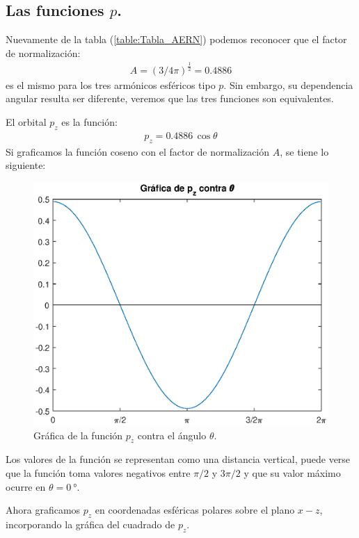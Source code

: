 \subsection*{Las funciones \texorpdfstring{$p$}{p}.}

Nuevamente de la tabla (\ref{table:Tabla_AERN}) podemos reconocer que el factor de normalización:
\begin{align*}
A = (3/4 \pi)^{\frac{1}{2}} = 0.4886
\end{align*}
es el mismo para los tres armónicos esféricos tipo $p$. Sin embargo, su dependencia angular resulta ser diferente, veremos que las tres funciones son equivalentes.
\par
El orbital $p_{z}$ es la función:
\begin{align*}
p_{z} = 0.4886 \, \cos \theta
\end{align*}
Si graficamos la función coseno con el factor de normalización $A$, se tiene lo siguiente:
\begin{figure}[H]
    \centering
    \includegraphics[scale=0.75]{Imagenes/Plot_AER_pz_theta.eps}
    \caption{Gráfica de la función $p_{z}$ contra el ángulo $\theta$.}
    \label{fig:plot_figura_pz_thetha}
\end{figure}
Los valores de la función se representan como una distancia vertical, puede verse que la función toma valores negativos entre $\pi/2$ y $3 \pi/2$ y que su valor máximo ocurre en $\theta = \SI{0}{\degree}$.
\par
Ahora graficamos $p_{z}$ en coordenadas esféricas polares sobre el plano $x-z$, incorporando la gráfica del cuadrado de $p_{z}$.
